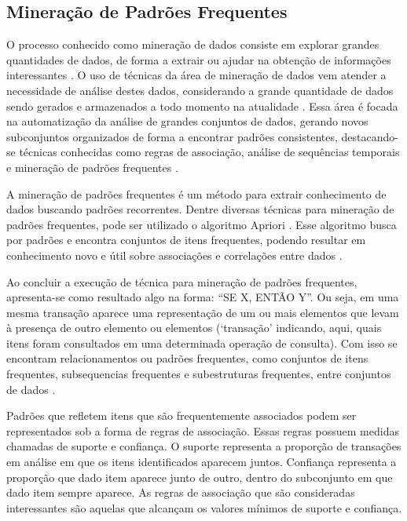 \documentclass[12pt]{article}
\begin{document}
\subsection{Mineração de Padrões Frequentes}
\label{subsec:padroes}
O processo conhecido como mineração de dados consiste em  explorar grandes quantidades de dados, de forma a extrair ou ajudar na obtenção de informações interessantes \citep{han2011data}. O uso de técnicas da área de mineração de dados vem atender a necessidade de  análise destes dados, considerando a grande quantidade de dados sendo gerados e armazenados a todo momento na atualidade \citep{chen2014big}. Essa área é focada na automatização da análise de grandes conjuntos de dados, gerando novos subconjuntos organizados de forma a encontrar padrões consistentes, destacando-se técnicas conhecidas como regras de associação, análise de sequências temporais e mineração de padrões frequentes \citep{han2011data}.

A mineração de padrões frequentes é um método para extrair conhecimento de dados buscando padrões recorrentes. Dentre diversas técnicas para mineração de padrões frequentes, pode ser utilizado o algoritmo Apriori \citep{agrawal1994fast}. Esse algoritmo busca por padrões e encontra conjuntos de itens frequentes, podendo resultar em conhecimento novo e útil sobre associações e correlações entre dados \citep{james2013introduction}.

Ao concluir a execução de técnica para mineração de padrões frequentes, apresenta-se como resultado algo na forma: ``SE  X, ENTÃO Y''. Ou seja, em uma mesma transação aparece uma representação de um ou mais elementos que levam à presença de outro elemento ou elementos (`transação' indicando, aqui, quais itens foram consultados em uma determinada operação de consulta). Com isso se encontram relacionamentos ou padrões frequentes, como conjuntos de itens frequentes, subsequencias frequentes e subestruturas frequentes, entre conjuntos de dados \citep{han2011data}. 

Padrões que refletem itens que são frequentemente associados podem ser representados sob a forma de regras de associação. Essas regras possuem medidas chamadas de suporte e confiança. O suporte representa a proporção  de transações em análise  em que os itens identificados aparecem juntos. 
Confiança representa a proporção que dado item aparece junto de outro, dentro do subconjunto em que dado item sempre aparece. As regras de associação que são consideradas interessantes são aquelas que alcançam os valores mínimos de suporte e confiança.
\end{document}
